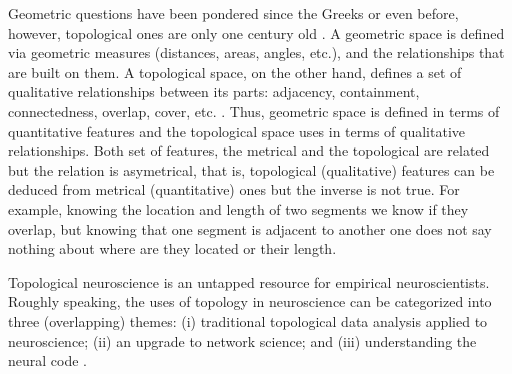\documentclass[onecollarge,runningheads]{svjour2}
\begin{document}
Geometric questions have been pondered since the Greeks or even before, however, topological ones are only one century old  \cite{edelsbrunner2010computational}.  A geometric space is defined via geometric measures (distances, areas, angles, etc.), and the relationships that are built on them. A topological space, on the other hand, defines a set of qualitative relationships between its parts: adjacency, containment, connectedness, overlap, cover, etc. \cite{aleksandrov1999mathematics}. Thus, geometric space is defined in terms of quantitative features and the topological space uses  
in terms of qualitative relationships.  Both set of features, the metrical and the topological are related but the relation is asymetrical, that is, topological (qualitative) features can be deduced from metrical (quantitative) ones but the inverse is not true. For example, knowing the location and length of two segments we know if they overlap, but knowing that one segment is adjacent to another one does not say nothing about where are they located or their length. 


Topological neuroscience is an untapped resource for empirical neuroscientists.
Roughly speaking, the uses of topology in neuroscience can be categorized into three (overlapping) themes: (i) traditional topological data analysis applied to neuroscience; (ii) an upgrade to network science; and (iii) understanding the neural code \cite{curto2016can}.
\end{document}
